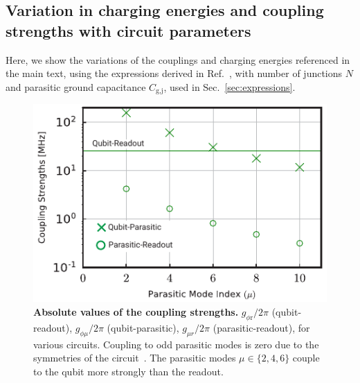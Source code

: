 \documentclass[%
reprint,
superscriptaddress,
 amsmath,amssymb,
 aps,
 prx,
longbibliography,
floatfix,
]{revtex4-2}
\begin{document}
\subsection{Variation in charging energies and coupling strengths with circuit parameters}\label{app:coupling}
Here, we show the variations of the couplings and charging energies referenced in the main text, using the expressions derived in Ref.~\cite{viola2015collective}, with number of junctions $N$ and parasitic ground capacitance $C_\textrm{g,j}$, used in Sec.~\ref{sec:expressions}. \begin{figure}[tbh]
    \centering
    \includegraphics[width=\linewidth]{Supp_Fig/Coupling-strength.pdf}
    \caption{{\bf Absolute values of the coupling strengths.} $g_{\phi \textrm{r}}/2\pi$ (qubit-readout), $g_{\phi\mu}/2\pi$ (qubit-parasitic), $g_{\mu r}/2\pi$ (parasitic-readout), for various circuits. Coupling to odd parasitic modes is zero due to the symmetries of the circuit~\cite{viola2015collective}. The parasitic modes $\mu\in\{2,4,6\}$ couple to the qubit more strongly than the readout.}
    \label{fig:coupling-strength}
\end{figure}
\end{document}
